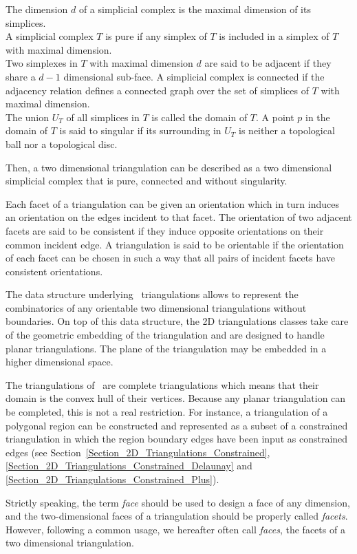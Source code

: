 The dimension $d$ of a  simplicial complex is the 
maximal dimension of its simplices. \\
A simplicial complex $T$ is pure if any simplex of $T$
is included in a simplex of $T$ with maximal dimension. \\
Two simplexes in $T$ with maximal dimension $d$ are said to be
adjacent if they share a $d-1$ dimensional sub-face.
A simplicial complex is connected if the adjacency relation
defines a connected graph 
over  the set of simplices of $T$ with maximal dimension. \\
The union $U_T$ of all simplices in $T$ is called the domain of $T$.
A point $p$ in the domain of $T$ is said to singular 
if its surrounding in $U_T$
is neither a topological ball nor a topological disc.

Then, a two dimensional triangulation can be described as a 
two dimensional simplicial complex  that is pure,
connected and without singularity.

Each facet of a triangulation can be given an orientation
which in turn induces an orientation
on the edges incident to that facet. The orientation of two adjacent
facets are said to be consistent if they induce
opposite orientations on their common incident edge.
A triangulation is said to be orientable if 
the orientation of each facet can be chosen in such a way
that all pairs of incident facets have consistent orientations. 

The data structure underlying \cgal\ triangulations
allows to represent the combinatorics of 
any  orientable two dimensional  triangulations
without boundaries. 
On top of this data structure, the 2D triangulations classes
take care of the geometric embedding  of the triangulation
and are designed to handle planar triangulations.
The plane of the triangulation may be embedded in a higher
dimensional space.

The  triangulations of  \cgal\ are complete triangulations
which means  that their domain is  the
convex hull of  their vertices.
Because any planar triangulation
can be completed, this is not a real restriction.
For instance, a triangulation of a  polygonal region can be
constructed  and represented as a subset  of a constrained triangulation 
in which  the region boundary edges have been input as 
constrained edges (see
Section~\ref{Section_2D_Triangulations_Constrained},
\ref{Section_2D_Triangulations_Constrained_Delaunay} and 
\ref{Section_2D_Triangulations_Constrained_Plus}).

Strictly speaking, the term {\em face} should be used
to design  a face of any dimension,
and the two-dimensional faces of a triangulation 
should be properly called {\em facets}.
However, following a common usage, we hereafter often call {\em
faces}, the facets
of a two dimensional triangulation.


